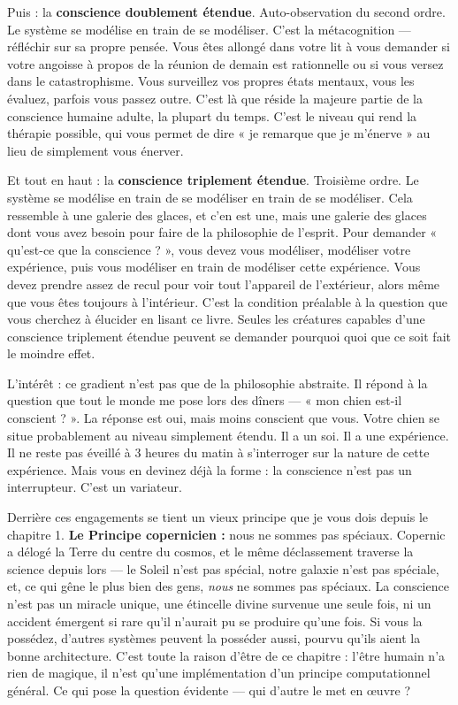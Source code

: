 \documentclass[11pt, twoside, openright]{book}
\begin{document}
Puis : la \textbf{conscience doublement étendue}. Auto-observation du second ordre. Le système se modélise en train de se modéliser. C'est la métacognition --- réfléchir sur sa propre pensée. Vous êtes allongé dans votre lit à vous demander si votre angoisse à propos de la réunion de demain est rationnelle ou si vous versez dans le catastrophisme. Vous surveillez vos propres états mentaux, vous les évaluez, parfois vous passez outre. C'est là que réside la majeure partie de la conscience humaine adulte, la plupart du temps. C'est le niveau qui rend la thérapie possible, qui vous permet de dire « je remarque que je m'énerve » au lieu de simplement vous énerver.

Et tout en haut : la \textbf{conscience triplement étendue}. Troisième ordre. Le système se modélise en train de se modéliser en train de se modéliser. Cela ressemble à une galerie des glaces, et c'en est une, mais une galerie des glaces dont vous avez besoin pour faire de la philosophie de l'esprit. Pour demander « qu'est-ce que la conscience ? », vous devez vous modéliser, modéliser votre expérience, puis vous modéliser en train de modéliser cette expérience. Vous devez prendre assez de recul pour voir tout l'appareil de l'extérieur, alors même que vous êtes toujours à l'intérieur. C'est la condition préalable à la question que vous cherchez à élucider en lisant ce livre. Seules les créatures capables d'une conscience triplement étendue peuvent se demander pourquoi quoi que ce soit fait le moindre effet.

L'intérêt : ce gradient n'est pas que de la philosophie abstraite. Il répond à la question que tout le monde me pose lors des dîners --- « mon chien est-il conscient ? ». La réponse est oui, mais moins conscient que vous. Votre chien se situe probablement au niveau simplement étendu. Il a un soi. Il a une expérience. Il ne reste pas éveillé à 3 heures du matin à s'interroger sur la nature de cette expérience. Mais vous en devinez déjà la forme : la conscience n'est pas un interrupteur. C'est un variateur.

Derrière ces engagements se tient un vieux principe que je vous dois depuis le chapitre 1. \textbf{Le Principe copernicien :} nous ne sommes pas spéciaux. Copernic a délogé la Terre du centre du cosmos, et le même déclassement traverse la science depuis lors --- le Soleil n'est pas spécial, notre galaxie n'est pas spéciale, et, ce qui gêne le plus bien des gens, \textit{nous} ne sommes pas spéciaux. La conscience n'est pas un miracle unique, une étincelle divine survenue une seule fois, ni un accident émergent si rare qu'il n'aurait pu se produire qu'une fois. Si vous la possédez, d'autres systèmes peuvent la posséder aussi, pourvu qu'ils aient la bonne architecture. C'est toute la raison d'être de ce chapitre : l'être humain n'a rien de magique, il n'est qu'une implémentation d'un principe computationnel général. Ce qui pose la question évidente --- qui d'autre le met en œuvre ?
\end{document}
